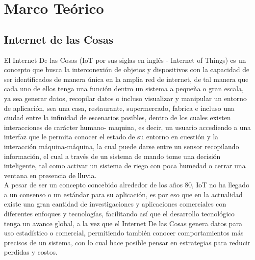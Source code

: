 \chapter{Marco Teórico}

\section{Internet de las Cosas}

El Internet De las Cosas (IoT por sus siglas en inglés - Internet of Things) es un concepto que busca la interconexión de objetos y dispositivos con la capacidad de ser identificados de manera única en la amplia red de internet, de tal manera que cada uno de ellos tenga una función dentro un sistema a pequeña o gran escala, ya sea generar datos, recopilar datos o incluso visualizar y manipular un entorno de aplicación, sea una casa, restaurante, supermercado, fabrica e incluso una ciudad entre la infinidad de escenarios posibles, dentro de los cuales existen interacciones de carácter humano- maquina, es decir, un usuario accediendo a una interfaz que le permita conocer el estado de su entorno en cuestión y la interacción máquina-máquina, la cual puede darse entre un sensor recopilando información, el cual a través de un sistema de mando tome una decisión inteligente, tal como activar un sistema de riego con poca humedad o cerrar una ventana en presencia de lluvia.\cite{TechT2017} \\

A pesar de ser un concepto concebido alrededor de los años 80, IoT no ha llegado a un consenso o un estándar para su aplicación, es por eso que en la actualidad existe una gran cantidad de investigaciones y aplicaciones comerciales con diferentes enfoques y tecnologías, facilitando así que el desarrollo tecnológico tenga un avance global, a la vez que el Internet De las Cosas genera datos para uso estadístico o comercial, permitiendo también conocer comportamientos más precisos de un sistema, con lo cual hace posible pensar en estrategias para reducir perdidas y costos.\cite{Asthon2009} \\


